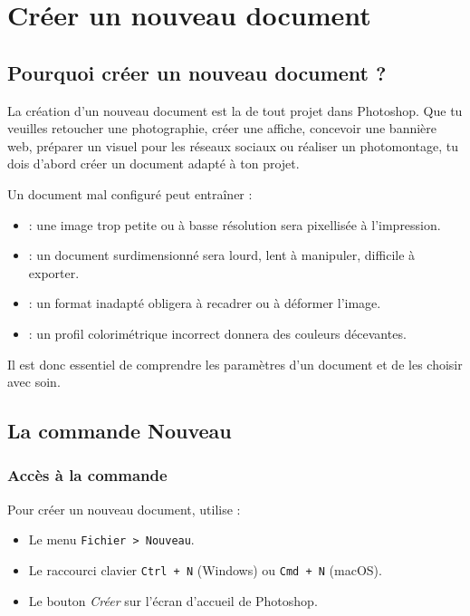 \section{Créer un nouveau document}

\subsection{Pourquoi créer un nouveau document ?}

La création d'un nouveau document est la  de tout projet dans Photoshop. Que tu veuilles retoucher une photographie, créer une affiche, concevoir une bannière web, préparer un visuel pour les réseaux sociaux ou réaliser un photomontage, tu dois d'abord créer un document adapté à ton projet.

Un document mal configuré peut entraîner :

\begin{itemize}
    \item {} : une image trop petite ou à basse résolution sera pixellisée à l'impression.
    \item {} : un document surdimensionné sera lourd, lent à manipuler, difficile à exporter.
    \item {} : un format inadapté obligera à recadrer ou à déformer l'image.
    \item {} : un profil colorimétrique incorrect donnera des couleurs décevantes.
\end{itemize}

Il est donc essentiel de comprendre les paramètres d'un document et de les choisir avec soin.

\subsection{La commande Nouveau}

\subsubsection{Accès à la commande}

Pour créer un nouveau document, utilise :

\begin{itemize}
    \item Le menu \texttt{Fichier > Nouveau}.
    \item Le raccourci clavier \texttt{Ctrl + N} (Windows) ou \texttt{Cmd + N} (macOS).
    \item Le bouton \emph{Créer} sur l'écran d'accueil de Photoshop.
\end{itemize}

